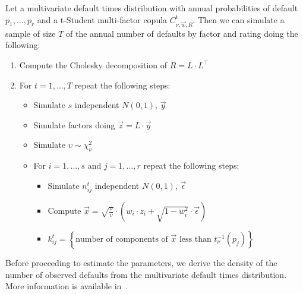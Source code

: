 \documentclass[11pt,fleqn]{book} %
\begin{document}
\begin{algorithm}
	\label{alg:snod}
	Let a multivariate default times distribution with annual probabilities 
	of default $p_1,\dots,p_r$ and a t-Student multi-factor copula 
	$C_{\nu,\vec{w},R}^{\text{t}}$. Then we can simulate a sample of size $T$ 
	of the annual number of defaults by factor and rating doing the following:
	\begin{enumerate}
		\item Compute the Cholesky decomposition of $R = L \cdot L^\intercal$
		\item For $t=1,\dots,T$ repeat the following steps:
		\begin{itemize}
			\item Simulate $s$ independent $N(0,1)$, $\vec{y}$
			\item Simulate factors doing $\vec{z} = L \cdot \vec{y}$
			\item Simulate $\upsilon \sim \chi_{\nu}^2$
			\item For $i=1,\dots,s$ and $j=1,\dots,r$ repeat the following steps:
			\begin{itemize}
				\item Simulate $n_{ij}^t$ independent $N(0,1)$, $\vec{\epsilon}$
				\item Compute $\vec{x} = \sqrt{\frac{\nu}{\upsilon}} \cdot \left( w_i \cdot z_i + \sqrt{1-w_i^2} \cdot \vec{\epsilon} \right)$
				\item $k_{ij}^t = \left\{ \text{number of components of $\vec{x}$ less than $t_{\nu}^{-1}(p_j)$} \right\} $
			\end{itemize}
		\end{itemize}
	\end{enumerate}
\end{algorithm}

Before proceeding to estimate the parameters, we derive the density of the 
number of observed defaults from the multivariate default times distribution. 
More information is available in~\cite{schonbucher:2000,gordy:2002,roncalli:2004}.
\end{document}
